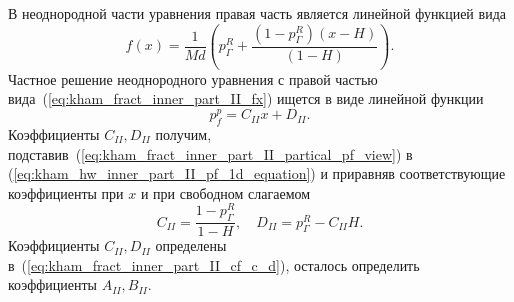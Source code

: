 \documentclass{article}
\begin{document}
В неоднородной части уравнения правая часть является линейной функцией вида
\begin{equation}
	\displaystyle
	f\left(x\right)=\dfrac{1}{Md} \left(p^R_{\Gamma} + \dfrac{\left( 1-p^R_{\Gamma}\right)\left(x-H\right)}{\left(1-H\right)}\right).
	\label{eq:kham_fract_inner_part_II_fx}
\end{equation}
Частное решение неоднородного уравнения с правой частью вида~(\ref{eq:kham_fract_inner_part_II_fx}) ищется в виде линейной функции
\begin{equation}
	\displaystyle
	p_f^p = C_{II} x + D_{II}.
	\label{eq:kham_fract_inner_part_II_partical_pf_view}
\end{equation}
Коэффициенты $C_{II}, D_{II}$ получим, подставив~(\ref{eq:kham_fract_inner_part_II_partical_pf_view}) в (\ref{eq:kham_hw_inner_part_II_pf_1d_equation})
и приравняв соответствующие коэффициенты при $x$ и при свободном слагаемом
\begin{equation}
	\displaystyle
	C_{II} = \dfrac{1-p^R_{\Gamma}}{1-H}, \quad
	D_{II} = p^R_{\Gamma} - C_{II} H.
	\label{eq:kham_fract_inner_part_II_cf_c_d}
\end{equation}
Коэффициенты $C_{II}, D_{II}$ определены в~(\ref{eq:kham_fract_inner_part_II_cf_c_d}), осталось определить коэффициенты $A_{II}, B_{II}$.

\end{document}
